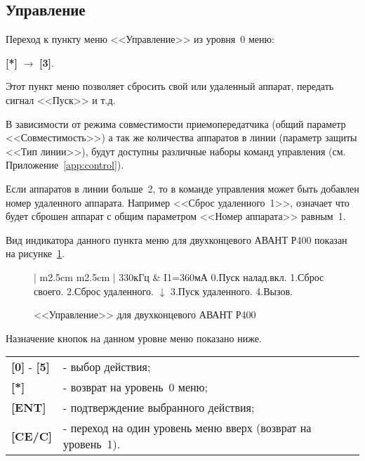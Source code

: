 \subsection{Управление}	\label{ssec:control}

Переход к пункту меню <<Управление>> из уровня~0 меню: 

\textbf{[*]} $\rightarrow$ \textbf{[3]}.

Этот пункт меню позволяет сбросить свой или удаленный аппарат, передать сигнал <<Пуск>> и т.д. 

В зависимости от режима совместимости приемопередатчика (общий параметр <<Совместимость>>) а так же количества аппаратов в линии (параметр защиты <<Тип линии>>), будут доступны различные наборы команд управления (см. Приложение~\ref{app:control}). 

Если аппаратов в линии больше~2, то в команде управления может быть добавлен номер удаленного аппарата. Например <<Сброс удаленного~1>>, означает что будет сброшен аппарат с общим параметром <<Номер аппарата>> равным~1.

Вид индикатора данного пункта меню для двухконцевого АВАНТ Р400 показан на рисунке~\ref{fig:control}. 

\begin{figure}[H]
	\centering
	
	\begin{tabular}{| m{2.5cm}  m{2.5cm} |}
		\firsthline
		330кГц	& \raggedleft I1=360мА				\tabularnewline 
		 {0.Пуск налад.вкл.}	\tabularnewline 
		 {1.Сброс своего. }		\tabularnewline 
		 {2.Сброс удаленного.} 	\tabularnewline \hline
		 {$\downarrow$}			\tabularnewline
		 {3.Пуск удаленного.} 	\tabularnewline 
		 {4.Вызов.}				\tabularnewline 
		\lasthline
	\end{tabular} 
	
	\caption{<<Управление>> для двухконцевого АВАНТ Р400}
	\label{fig:control}
\end{figure}

Назначение кнопок на данном уровне меню показано ниже.
\begin{center}
	\begin{tabular}{p{2cm} p{15cm}}
		\textbf{[0]} - \textbf{[5]} & - выбор действия; \tabularnewline 
		\textbf{[*]} 	& - возврат на уровень~0 меню; \tabularnewline
		\textbf{[ENT]} 	& - подтверждение выбранного действия; \tabularnewline
		\textbf{[CE/C]} & - переход на один уровень меню вверх (возврат на уровень~1). \tabularnewline				
	\end{tabular} 
\end{center}